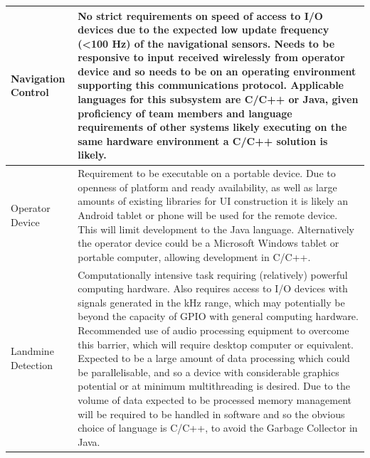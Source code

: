\documentclass[main.tex]{subfiles}
\begin{document}
\begin{appendices}
{\begin{longtable}{ L{0.25\textwidth} L{0.65\textwidth}}
Navigation Control &
No strict requirements on speed of access to I/O devices due to the expected low update frequency (<100 Hz) of the navigational sensors. Needs to be responsive to input received wirelessly from operator device and so needs to be on an operating environment supporting this communications protocol. Applicable languages for this subsystem are C/C++ or Java, given proficiency of team members and language requirements of other systems likely executing on the same hardware environment a C/C++ solution is likely.\\ \midrule


Operator Device &
Requirement to be executable on a portable device. Due to openness of platform and ready availability, as well as large amounts of existing libraries for UI construction it is likely an Android tablet or phone will be used for the remote device. This will limit development to the Java language. Alternatively the operator device could be a Microsoft Windows tablet or portable computer, allowing development in C/C++.\\ \midrule

Landmine Detection &
Computationally intensive task requiring (relatively) powerful computing hardware. Also requires access to I/O devices with signals generated in the kHz range, which may potentially be beyond the capacity of GPIO with general computing hardware. Recommended use of audio processing equipment to overcome this barrier, which will require desktop computer or equivalent. Expected to be a large amount of data processing which could be parallelisable, and so a device with considerable graphics potential or at minimum multithreading is desired.
Due to the volume of data expected to be processed memory management will be required to be handled in software and so the obvious choice of language is C/C++, to avoid the Garbage Collector in Java.\\

\bottomrule

\end{longtable}}
 

 

\end{appendices}
\end{document}
